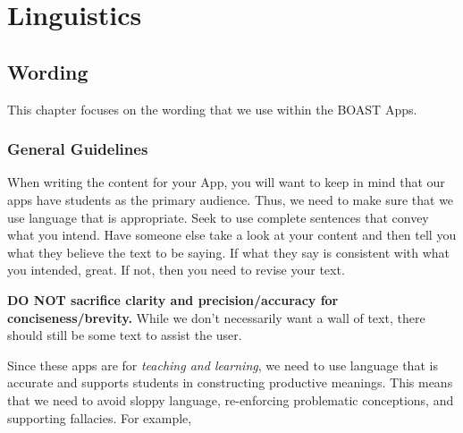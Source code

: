 \documentclass[
]{book}
\begin{document}
\hypertarget{part-linguistics}{%
\part{Linguistics}\label{part-linguistics}}

\hypertarget{wording}{%
\chapter{Wording}\label{wording}}

This chapter focuses on the wording that we use within the BOAST Apps.

\hypertarget{general-guidelines}{%
\section{General Guidelines}\label{general-guidelines}}

When writing the content for your App, you will want to keep in mind that our apps have students as the primary audience. Thus, we need to make sure that we use language that is appropriate. Seek to use complete sentences that convey what you intend. Have someone else take a look at your content and then tell you what they believe the text to be saying. If what they say is consistent with what you intended, great. If not, then you need to revise your text.

\textbf{DO NOT sacrifice clarity and precision/accuracy for
conciseness/brevity.} While we don't necessarily want a wall of text, there should still be some text to assist the user.

Since these apps are for \emph{teaching and learning}, we need to use language that is accurate and supports students in constructing productive meanings. This means that we need to avoid sloppy language, re-enforcing problematic conceptions, and supporting fallacies. For example,
\end{document}
